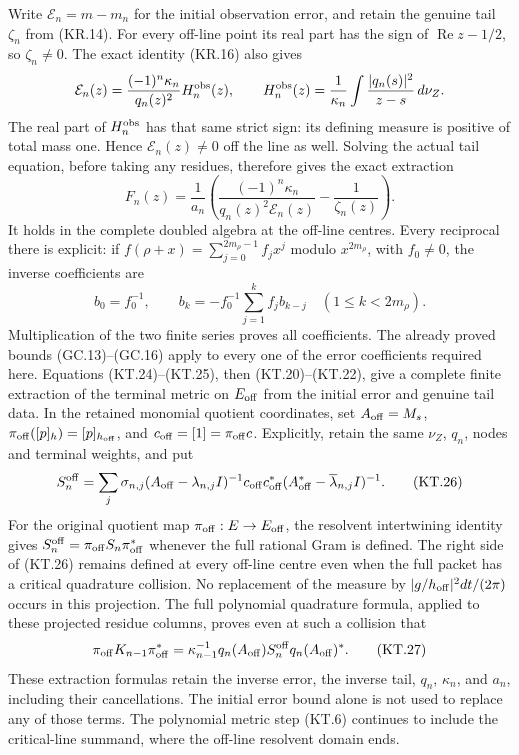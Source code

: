 Write \(\mathcal E_n=m-m_n\) for the initial observation error,
and retain the genuine tail \(\zeta_n\) from (KR.14).
For every off-line point its real part has the sign of
\(\operatorname{Re}z-1/2\), so \(\zeta_n\ne0\).
The exact identity (KR.16) also gives
\[
 \mathcal E_n(z)=\frac{(-1)^n\kappa_n}{q_n(z)^2}
    H_n^{\rm obs}(z),\qquad
 H_n^{\rm obs}(z)=\frac1{\kappa_n}
              \int\frac{|q_n(s)|^2}{z-s}\,d\nu_Z.
\]
The real part of \(H_n^{\rm obs}\) has that same strict sign:
its defining measure is positive of total mass one.  Hence
\(\mathcal E_n(z)\ne0\) off the line as well.
Solving the actual tail equation, before taking any residues,
therefore gives the exact extraction
\[
 \boxed{F_n(z)=\frac1{a_n}
   \left(\frac{(-1)^n\kappa_n}{q_n(z)^2\mathcal E_n(z)}
                         -\frac1{\zeta_n(z)}\right).}   \tag{KT.24}
\]
It holds in the complete doubled algebra at the off-line centres.
Every reciprocal there is explicit: if
\(f(\rho+x)=\sum_{j=0}^{2m_\rho-1}f_jx^j\) modulo
\(x^{2m_\rho}\), with \(f_0\ne0\), the inverse coefficients
are
\[
 b_0=f_0^{-1},\qquad
 b_k=-f_0^{-1}\sum_{j=1}^kf_jb_{k-j}
                   \quad(1\leq k<2m_\rho).             \tag{KT.25}
\]
Multiplication of the two finite series proves all coefficients.
The already proved bounds (GC.13)--(GC.16) apply to every one of
the error coefficients required here.  Equations (KT.24)--(KT.25),
then (KT.20)--(KT.22), give a complete finite extraction of the
terminal metric on \(E_{\rm off}\) from the initial error and
genuine tail data.  In the retained monomial quotient coordinates,
set \(A_{\rm off}=M_s\),
\(\pi_{\rm off}([p]_h)=[p]_{h_{\rm off}}\), and
\(c_{\rm off}=[1]=\pi_{\rm off}c\).
Explicitly, retain the same \(\nu_Z\),
\(q_n\), nodes and terminal weights, and put
\[
 S_n^{\rm off}=\sum_j\sigma_{n,j}
   (A_{\rm off}-\lambda_{n,j}I)^{-1}c_{\rm off}c_{\rm off}^*
   (A_{\rm off}^*-\overline\lambda_{n,j}I)^{-1}.
                                                               \tag{KT.26}
\]
For the original quotient map \(\pi_{\rm off}:E\to E_{\rm off}\),
the resolvent intertwining identity gives
\(S_n^{\rm off}=\pi_{\rm off}S_n\pi_{\rm off}^*\) whenever
the full rational Gram is defined.  The right side of (KT.26)
remains defined at every off-line centre even when the full packet
has a critical quadrature collision.  No replacement of the measure
by \(|g/h_{\rm off}|^2dt/(2\pi)\) occurs in this projection.
The full polynomial quadrature formula, applied to these projected
residue columns, proves even at such a collision that
\[
 \pi_{\rm off}K_{n-1}\pi_{\rm off}^*
   =\kappa_{n-1}^{-1}q_n(A_{\rm off})S_n^{\rm off}
                                     q_n(A_{\rm off})^*.
                                                               \tag{KT.27}
\]
These extraction formulas retain the inverse error, the inverse tail, \(q_n\),
\(\kappa_n\), and \(a_n\), including their cancellations.
The initial error bound alone is not used to replace any of those
terms.  The polynomial metric step (KT.6) continues to include the
critical-line summand, where the off-line resolvent domain ends.

